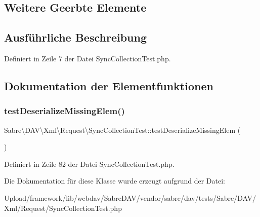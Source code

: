 \subsection*{Weitere Geerbte Elemente}


\subsection{Ausführliche Beschreibung}


Definiert in Zeile 7 der Datei Sync\+Collection\+Test.\+php.



\subsection{Dokumentation der Elementfunktionen}
\mbox{\label{class_sabre_1_1_d_a_v_1_1_xml_1_1_request_1_1_sync_collection_test_ab4b42ecc29a80bb59e282cf0ad5a9ab4}} 
\subsubsection{\texorpdfstring{test\+Deserialize\+Missing\+Elem()}{testDeserializeMissingElem()}}
{\footnotesize\ttfamily Sabre\textbackslash{}\+D\+A\+V\textbackslash{}\+Xml\textbackslash{}\+Request\textbackslash{}\+Sync\+Collection\+Test\+::test\+Deserialize\+Missing\+Elem (\begin{DoxyParamCaption}{ }\end{DoxyParamCaption})}



Definiert in Zeile 82 der Datei Sync\+Collection\+Test.\+php.



Die Dokumentation für diese Klasse wurde erzeugt aufgrund der Datei\+:\begin{DoxyCompactItemize}
\item 
Upload/framework/lib/webdav/\+Sabre\+D\+A\+V/vendor/sabre/dav/tests/\+Sabre/\+D\+A\+V/\+Xml/\+Request/Sync\+Collection\+Test.\+php\end{DoxyCompactItemize}
